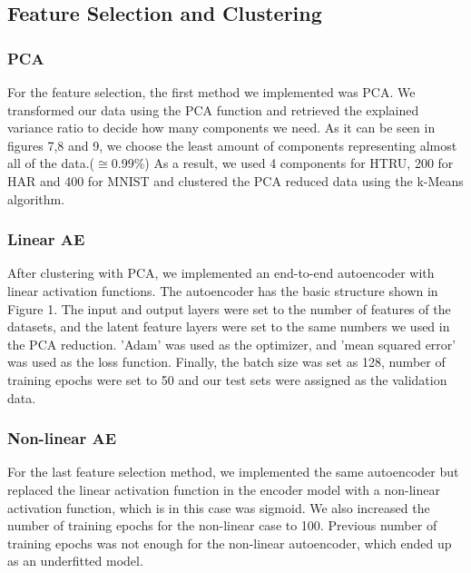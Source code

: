 \documentclass[journal]{IEEEtran}
\begin{document}
\subsection{Feature Selection and Clustering}
\subsubsection{PCA}
For the feature selection, the first method we implemented was PCA. We transformed our data using the PCA function and retrieved the explained variance ratio to decide how many components we need. As it can be seen in figures 7,8 and 9, we choose the least amount of components representing almost all of the data.($\cong$0.99\%) As a result, we used 4 components for HTRU, 200 for HAR and 400 for MNIST and clustered the PCA reduced data using the k-Means algorithm. 
\par
\subsubsection{Linear AE}
After clustering with PCA, we implemented an end-to-end autoencoder with linear activation functions. The autoencoder has the basic structure shown in Figure 1. The input and output layers were set to the number of features of the datasets, and the latent feature layers were set to the same numbers we used in the PCA reduction. 'Adam' was used as the optimizer, and 'mean squared error' was used as the loss function. Finally, the batch size was set as 128, number of training epochs were set to 50 and our test sets were assigned as the validation data. \par
\subsubsection{Non-linear AE}
For the last feature selection method, we implemented the same autoencoder but replaced the linear activation function in the encoder model with a non-linear activation function, which is in this case was sigmoid. We also increased the number of training epochs for the non-linear case to 100. Previous number of training epochs was not enough for the non-linear autoencoder, which ended up as an underfitted model.
\end{document}
